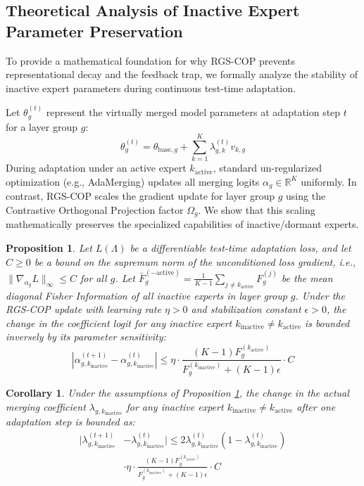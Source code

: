 \documentclass{article}
\theoremstyle{plain}
\newtheorem{proposition}[theorem]{Proposition}
\newtheorem{corollary}[theorem]{Corollary}
\theoremstyle{definition}
\theoremstyle{remark}
\begin{document}
\subsection{Theoretical Analysis of Inactive Expert Parameter Preservation}
To provide a mathematical foundation for why RGS-COP prevents representational decay and the feedback trap, we formally analyze the stability of inactive expert parameters during continuous test-time adaptation.

Let $\theta^{(t)}_g$ represent the virtually merged model parameters at adaptation step $t$ for a layer group $g$:
\begin{equation}
    \theta^{(t)}_g = \theta_{\text{base}, g} + \sum_{k=1}^K \lambda^{(t)}_{g, k} v_{k, g}
\end{equation}
During adaptation under an active expert $k_{\text{active}}$, standard un-regularized optimization (e.g., AdaMerging) updates all merging logits $\alpha_g \in \mathbb{R}^K$ uniformly. In contrast, RGS-COP scales the gradient update for layer group $g$ using the Contrastive Orthogonal Projection factor $\Omega_g$. We show that this scaling mathematically preserves the specialized capabilities of inactive/dormant experts.

\begin{proposition}\label{prop:preservation}
Let $L(\Lambda)$ be a differentiable test-time adaptation loss, and let $C \geq 0$ be a bound on the supremum norm of the unconditioned loss gradient, i.e., $\|\nabla_{\alpha_g} L\|_\infty \leq C$ for all $g$. Let $\bar{F}^{(-\text{active})}_g = \frac{1}{K-1} \sum_{j \neq k_{\text{active}}} F^{(j)}_g$ be the mean diagonal Fisher Information of all inactive experts in layer group $g$. Under the RGS-COP update with learning rate $\eta > 0$ and stabilization constant $\epsilon > 0$, the change in the coefficient logit for any inactive expert $k_{\text{inactive}} \neq k_{\text{active}}$ is bounded inversely by its parameter sensitivity:
\begin{equation}
    |\alpha^{(t+1)}_{g, k_{\text{inactive}}} - \alpha^{(t)}_{g, k_{\text{inactive}}}| \leq \eta \cdot \frac{(K-1) F^{(k_{\text{active}})}_g}{F^{(k_{\text{inactive}})}_g + (K-1)\epsilon} \cdot C
\end{equation}
\end{proposition}

\begin{corollary}\label{corr:preservation_coef}
Under the assumptions of Proposition \ref{prop:preservation}, the change in the actual merging coefficient $\lambda_{g, k_{\text{inactive}}}$ for any inactive expert $k_{\text{inactive}} \neq k_{\text{active}}$ after one adaptation step is bounded as:
\begin{equation}
\begin{aligned}
    |\lambda^{(t+1)}_{g, k_{\text{inactive}}} &- \lambda^{(t)}_{g, k_{\text{inactive}}}| \leq 2 \lambda^{(t)}_{g, k_{\text{inactive}}} (1 - \lambda^{(t)}_{g, k_{\text{inactive}}}) \\
    &\cdot \eta \cdot \frac{(K-1) F^{(k_{\text{active}})}_g}{F^{(k_{\text{inactive}})}_g + (K-1)\epsilon} \cdot C
\end{aligned}
\end{equation}
\end{corollary}
\end{document}
